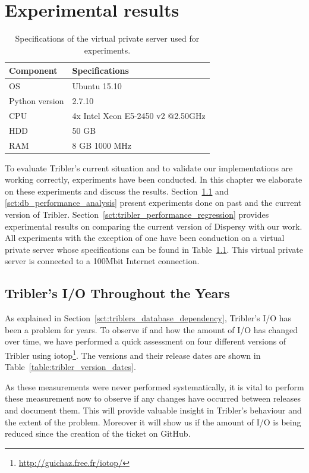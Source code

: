 \chapter{Experimental results}
\label{cpt:experiments}

\begin{table}[h]
	\centering
	\caption{Specifications of the virtual private server used for experiments.}
	\label{table:virtual_machine_specs}
	\begin{tabular}{l|l}
		\textbf{Component} 	& \textbf{Specifications} \\ \hline
		OS   				& Ubuntu 15.10 \\
		Python version		& 2.7.10 \\
		CPU					& 4x Intel Xeon E5-2450 v2 @2.50GHz \\ 
		HDD					& 50 GB  \\ 
		RAM					& 8 GB 1000 MHz  \\
	\end{tabular}
\end{table}

To evaluate Tribler's current situation and to validate our implementations are working correctly, experiments have been conducted.
In this chapter we elaborate on these experiments and discuss the results. 
Section~\ref{sct:tribler_io_past} and \ref{sct:db_performance_analysis} present experiments done on past and the current version of Tribler.
Section~\ref{sct:tribler_performance_regression} provides experimental results on comparing the current version of Dispersy with our work.
All experiments with the exception of one have been conduction on a virtual private server whose specifications can be found in Table~\ref{table:virtual_machine_specs}.
This virtual private server is connected to a 100Mbit Internet connection.

\section{Tribler's I/O Throughout the Years}
\label{sct:tribler_io_past}
As explained in Section~\ref{sct:triblers_database_dependency}, Tribler's I/O has been a problem for years.
To observe if and how the amount of I/O has changed over time, we have performed a quick assessment on four different versions of Tribler using iotop\footnote{\url{http://guichaz.free.fr/iotop/}}.
The versions and their release dates are shown in Table~\ref{table:tribler_version_dates}.

As these measurements were never performed systematically, it is vital to perform these measurement now to observe if any changes have occurred between releases and document them.
This will provide valuable insight in Tribler's behaviour and the extent of the problem.
Moreover it will show us if the amount of I/O is being reduced since the creation of the ticket on GitHub.

